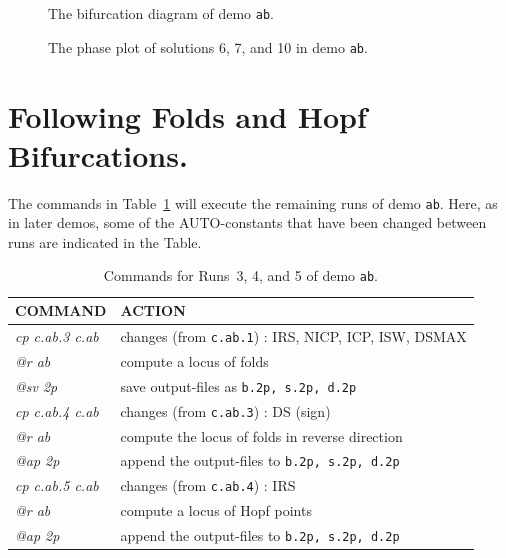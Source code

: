 \documentclass[12pt]{report}
\begin{document}
\begin{figure}[p]
\epsfysize 9.0cm
\centerline{}
\caption{The bifurcation diagram of demo {\tt ab}.}
\label{fig:ab_1}
\end{figure}

\begin{figure}[p]
\epsfysize 9.0cm
\centerline{}
\caption{The phase plot of solutions 6, 7, and 10 in demo {\tt ab}.}
\label{fig:ab_2}
\end{figure}


\section{ Following Folds and Hopf Bifurcations.} \label{sec:Tutorial_2_par}
The commands in Table~\ref{tbl:demo_ab_9} will execute the remaining
runs of demo {\tt ab}.
Here, as in later demos, some of the {\cal AUTO}-constants that have been changed
between runs are indicated in the Table.
\begin{table}[htbp]
\begin{center}
\begin{tabular}{| l | l |}
\hline
   COMMAND  & ACTION \\
\hline
  {\it cp c.ab.3 c.ab} & changes (from {\tt c.ab.1}) : IRS, NICP, ICP, ISW, DSMAX \\ 
  {\it @r ab} &  compute a locus of folds \\ 
  {\it @sv 2p} & save output-files as {\tt b.2p, s.2p, d.2p} \\ 
\hline
  {\it cp c.ab.4 c.ab} & changes (from {\tt c.ab.3}) : DS (sign) \\ 
  {\it @r ab} &  compute the  locus of folds in reverse direction \\ 
  {\it @ap 2p} &  append the output-files to {\tt b.2p, s.2p, d.2p} \\ 
\hline
  {\it cp c.ab.5 c.ab} & changes (from {\tt c.ab.4}) : IRS \\ 
  {\it @r ab} &  compute a locus of Hopf points \\ 
  {\it @ap 2p} & append the output-files to {\tt b.2p, s.2p, d.2p} \\ 
\hline
\end{tabular}
\caption{Commands for Runs~3, 4, and 5 of demo {\tt ab}.}
\label{tbl:demo_ab_9}
\end{center}
\end{table}
\end{document}
